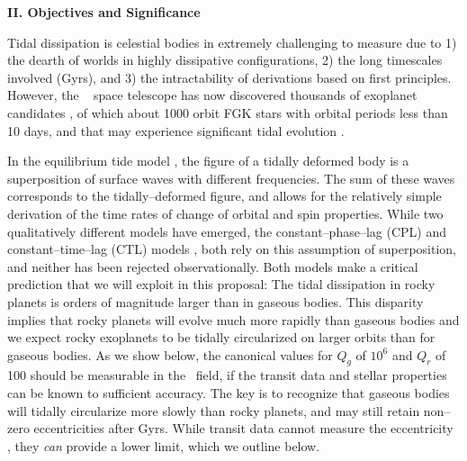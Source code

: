 \bigskip
\centerline{\bf II. Objectives and Significance}
\smallskip

\medskip
{\centerline{}}
\smallskip

Tidal dissipation is celestial bodies in extremely challenging to
measure
\citep{GoldreichSoter66,Hut81,AksnesFranklin01,Jackson08a,Jackson09,Makarov12}
due to 1) the dearth of worlds in highly dissipative configurations,
2) the long timescales involved (Gyrs), and 3) the intractability of
derivations based on first principles.  However, the \kepler~ space
telescope has now discovered thousands of exoplanet candidates
\citep{2013ApJS..204...24B}, of which about 1000 orbit FGK stars with
orbital periods less than 10 days, and that may experience significant
tidal evolution \cite{Rasio96,Jackson08a,Matsumura10}.

In the equilibrium tide model
\citep{Darwin1880,MacDonald64,GoldreichSoter66,Hut81,FerrazMello08,Leconte10},
the figure of a tidally deformed body is a superposition of surface
waves with different frequencies.  The sum of these waves corresponds
to the tidally--deformed figure, and allows for the relatively simple
derivation of the time rates of change of orbital and spin properties.
While two qualitatively different models have emerged, the
constant--phase--lag (CPL) and constant--time--lag (CTL) models
\citep{Greenberg09}, both rely on this assumption of superposition,
and neither has been rejected observationally.  Both models make a
critical prediction that we will exploit in this proposal: The tidal
dissipation in rocky planets is orders of magnitude larger than in
gaseous bodies.  This disparity implies that rocky planets will evolve
much more rapidly than gaseous bodies and we expect rocky exoplanets
to be tidally circularized on larger orbits than for gaseous bodies.
As we show below, the canonical values for $Q_g$ of $10^6$ and $Q_r$
of 100 should be measurable in the \kepler~field, if the transit data
and stellar properties can be known to sufficient accuracy.  The key
is to recognize that gaseous bodies will tidally circularize more
slowly than rocky planets, and may still retain non--zero
eccentricities after Gyrs.  While transit data cannot measure the
eccentricity \citep{Barnes07}, they {\it can} provide a lower limit,
which we outline below.

\medskip
{\centerline{}}
\smallskip

